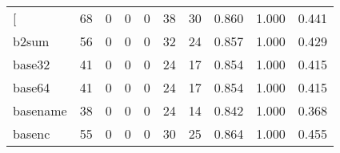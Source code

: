 \begin{longtable}{lp{2.0cm}p{2.0cm}p{2.0cm}p{2.0cm}p{2.0cm}p{2.0cm}p{2.0cm}p{2.0cm}p{2.0cm}}
\bottomrule
\endlastfoot
{[}         &                     68 &                                             0 &                                            0 &                                           0 &                                           38 &                                         30 &                                0.860 &                                  1.000 &                                0.441 \\
b2sum     &                     56 &                                             0 &                                            0 &                                           0 &                                           32 &                                         24 &                                0.857 &                                  1.000 &                                0.429 \\
base32    &                     41 &                                             0 &                                            0 &                                           0 &                                           24 &                                         17 &                                0.854 &                                  1.000 &                                0.415 \\
base64    &                     41 &                                             0 &                                            0 &                                           0 &                                           24 &                                         17 &                                0.854 &                                  1.000 &                                0.415 \\
basename  &                     38 &                                             0 &                                            0 &                                           0 &                                           24 &                                         14 &                                0.842 &                                  1.000 &                                0.368 \\
basenc    &                     55 &                                             0 &                                            0 &                                           0 &                                           30 &                                         25 &                                0.864 &                                  1.000 &                                0.455 \\

\end{longtable}
